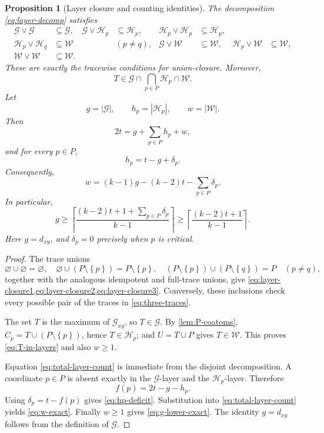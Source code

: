 \documentclass[11pt,reqno]{amsart}
\numberwithin{equation}{section}
\newtheorem{proposition}[proposition]{Proposition}
\theoremstyle{definition}
\theoremstyle{remark}
\newcommand{\G}{\mathcal{G}}
\newcommand{\Hh}{\mathcal{H}}
\newcommand{\W}{\mathcal{W}}
\newcommand{\1}{\mathbf{1}}
\newcommand{\set}[1]{\left\{#1\right\}}
\newcommand{\abs}[1]{\left|#1\right|}
\newcommand{\join}{\mathbin{\vee}}
\begin{document}
\begin{proposition}[Layer closure and counting identities]\label{prop:layer-count}
The decomposition \cref{eq:layer-decomp} satisfies
\begin{align}
\G\join\G&\subseteq\G,
&\G\join\Hh_p&\subseteq\Hh_p,
&\Hh_p\join\Hh_p&\subseteq\Hh_p,
\label{eq:layer-closure1}\\
\Hh_p\join\Hh_q&\subseteq\W &&(p\ne q),
&\G\join\W&\subseteq\W,
&\Hh_p\join\W&\subseteq\W,
\label{eq:layer-closure2}\\
\W\join\W&\subseteq\W.&&&&
\label{eq:layer-closure3}
\end{align}
These are exactly the tracewise conditions for union-closure.  Moreover,
\begin{equation}\label{eq:T-in-layers}
T\in\G\cap\bigcap_{p\in P}\Hh_p\cap\W.
\end{equation}
Let
\[
g=\abs{\G},
\qquad
h_p=\abs{\Hh_p},
\qquad
w=\abs{\W}.
\]
Then
\begin{equation}\label{eq:total-layer-count}
2t=g+\sum_{p\in P}h_p+w,
\end{equation}
and for every \(p\in P\),
\begin{equation}\label{eq:hp-deficit}
h_p=t-g+\delta_p.
\end{equation}
Consequently,
\begin{equation}\label{eq:w-exact}
\boxed{
w=(k-1)g-(k-2)t-\sum_{p\in P}\delta_p.}
\end{equation}
In particular,
\begin{equation}\label{eq:g-lower-exact}
\boxed{
g\ge
\left\lceil
\frac{(k-2)t+1+\sum_{p\in P}\delta_p}{k-1}
\right\rceil
\ge
\left\lceil
\frac{(k-2)t+1}{k-1}
\right\rceil.}
\end{equation}
Here \(g=d_{xy}\), and \(\delta_p=0\) precisely when \(p\) is critical.
\end{proposition}

\begin{proof}
The trace unions
\[
\varnothing\cup\varnothing=\varnothing,
\quad
\varnothing\cup(P\setminus\set{p})=P\setminus\set{p},
\quad
(P\setminus\set{p})\cup(P\setminus\set{q})=P\quad(p\ne q),
\]
together with the analogous idempotent and full-trace unions, give \cref{eq:layer-closure1,eq:layer-closure2,eq:layer-closure3}.  Conversely, these inclusions check every possible pair of the traces in \cref{eq:three-traces}.

The set \(T\) is the maximum of \(\G_{xy}\), so \(T\in\G\).  By \cref{lem:P-coatoms},
\(
C_p=T\cup(P\setminus\set{p})
\), hence \(T\in\Hh_p\); and \(U=T\cup P\) gives \(T\in\W\).  This proves \cref{eq:T-in-layers} and also \(w\ge1\).

Equation \cref{eq:total-layer-count} is immediate from the disjoint decomposition.  A coordinate \(p\in P\) is absent exactly in the \(\G\)-layer and the \(\Hh_p\)-layer.  Therefore
\[
f(p)=2t-g-h_p.
\]
Using \(\delta_p=t-f(p)\) gives \cref{eq:hp-deficit}.  Substitution into \cref{eq:total-layer-count} yields \cref{eq:w-exact}.  Finally \(w\ge1\) gives \cref{eq:g-lower-exact}.  The identity \(g=d_{xy}\) follows from the definition of \(\G\).
\end{proof}
\end{document}
